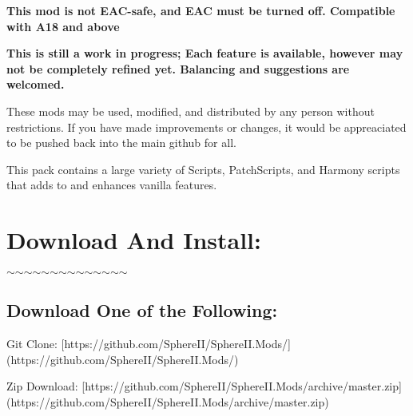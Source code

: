 {\bfseries{This mod is not E\+A\+C-\/safe, and E\+AC must be turned off. Compatible with A18 and above}}

{\bfseries{This is still a work in progress; Each feature is available, however may not be completely refined yet. Balancing and suggestions are welcomed.}}

These mods may be used, modified, and distributed by any person without restrictions. If you have made improvements or changes, it would be appreaciated to be pushed back into the main github for all.

This pack contains a large variety of Scripts, Patch\+Scripts, and Harmony scripts that adds to and enhances vanilla features.



 \hypertarget{index_autotoc_md9}{}\section{Download And Install\+:  }\label{index_autotoc_md9}
$\sim$$\sim$$\sim$$\sim$$\sim$$\sim$$\sim$$\sim$$\sim$$\sim$$\sim$$\sim$$\sim$$\sim$ \hypertarget{index_autotoc_md10}{}\subsection{Download One of the Following\+:}\label{index_autotoc_md10}
\begin{DoxyVerb}Git Clone:  [https://github.com/SphereII/SphereII.Mods/](https://github.com/SphereII/SphereII.Mods/)

Zip Download: [https://github.com/SphereII/SphereII.Mods/archive/master.zip](https://github.com/SphereII/SphereII.Mods/archive/master.zip)
\end{DoxyVerb}


